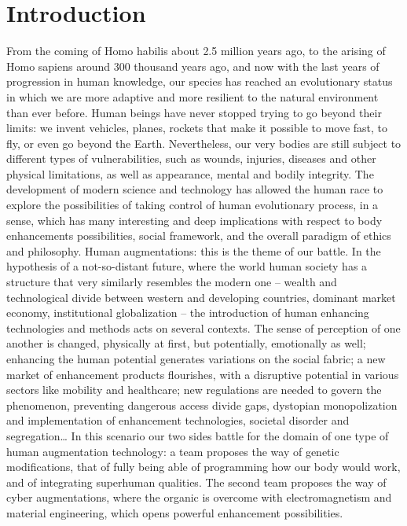 \chapter*{Introduction}
\label{cha:introduction}

From the coming of Homo habilis about 2.5 million years ago, to the arising of Homo sapiens around 300 thousand years ago, and now with the last years of progression in human knowledge, our species has reached an evolutionary status in which we are more adaptive and more resilient to the natural environment than ever before. Human beings have never stopped trying to go beyond their limits: we invent vehicles, planes, rockets that make it possible to move fast, to fly, or even go beyond the Earth. Nevertheless, our very bodies are still subject to different types of vulnerabilities, such as wounds, injuries, diseases and other physical limitations, as well as appearance, mental and bodily integrity.
The development of modern science and technology has allowed the human race to explore the possibilities of taking control of human evolutionary process, in a sense, which has many interesting and deep implications with respect to body enhancements possibilities, social framework, and the overall paradigm of ethics and philosophy.
Human augmentations: this is the theme of our battle.
In the hypothesis of a not-so-distant future, where the world human society has a structure that very similarly resembles the modern one – wealth and technological divide between western and developing countries, dominant market economy, institutional globalization – the introduction of human enhancing technologies and methods acts on several contexts. The sense of perception of one another is changed, physically at first, but potentially, emotionally as well; enhancing the human potential generates variations on the social fabric; a new market of enhancement products flourishes, with a disruptive potential in various sectors like mobility and healthcare; new regulations are needed to govern the phenomenon, preventing dangerous access divide gaps, dystopian monopolization and implementation of enhancement technologies, societal disorder and segregation…
In this scenario our two sides battle for the domain of one type of human augmentation technology: a team proposes the way of genetic modifications, that of fully being able of programming how our body would work, and of integrating superhuman qualities. The second team proposes the way of cyber augmentations, where the organic is overcome with electromagnetism and material engineering, which opens powerful enhancement possibilities.
